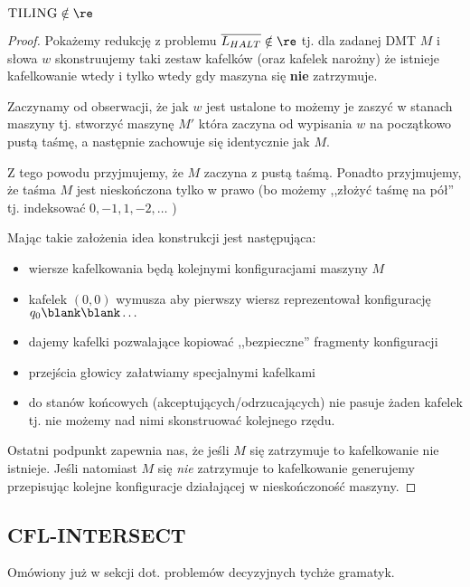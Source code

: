 \begin{theorem}
    \( \textsc{TILING} \notin \re \)
\end{theorem}
\begin{proof}
    Pokażemy redukcję z problemu \( \overline{L_{HALT}} \notin \re \) tj. dla zadanej DMT \( M \) i słowa \( w \) skonstruujemy taki zestaw kafelków (oraz kafelek narożny) że istnieje kafelkowanie wtedy i tylko wtedy gdy maszyna się \textbf{nie} zatrzymuje.
    
    Zaczynamy od obserwacji, że jak \( w \) jest ustalone to możemy je zaszyć w stanach maszyny tj. stworzyć maszynę \( M' \) która zaczyna od wypisania \( w \) na początkowo pustą taśmę, a następnie zachowuje się identycznie jak \( M \). 
    
    Z tego powodu przyjmujemy, że \( M \) zaczyna z pustą taśmą. Ponadto przyjmujemy, że taśma \( M \) jest nieskończona tylko w prawo (bo możemy ,,złożyć taśmę na pół'' tj. indeksować \( 0, -1, 1, -2, \dots \) )
    
    Mając takie założenia idea konstrukcji jest następująca:
    \begin{itemize}
        \item wiersze kafelkowania będą kolejnymi konfiguracjami maszyny \( M \)
        \item kafelek \( (0, 0) \) wymusza aby pierwszy wiersz reprezentował konfigurację \( q_0 \blank \blank \dots \)
        \item dajemy kafelki pozwalające kopiować ,,bezpieczne'' fragmenty konfiguracji
        \item przejścia głowicy załatwiamy specjalnymi kafelkami
        \item do stanów końcowych (akceptujących/odrzucających) nie pasuje żaden kafelek tj. nie możemy nad nimi skonstruować kolejnego rzędu.
    \end{itemize}
    
    Ostatni podpunkt zapewnia nas, że jeśli \( M \) się zatrzymuje to kafelkowanie nie istnieje.
    Jeśli natomiast \( M \) się \textit{nie} zatrzymuje to kafelkowanie generujemy przepisując kolejne konfiguracje działającej w nieskończoność maszyny.
    
\end{proof}

\subsection{CFL-INTERSECT}

Omówiony już w sekcji dot. problemów decyzyjnych tychże gramatyk.